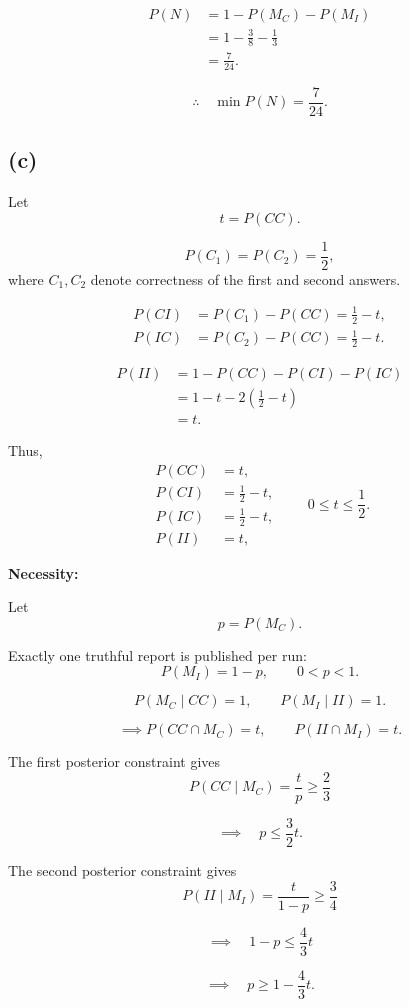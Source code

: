 \documentclass[11pt,a4paper]{article}
\begin{document}
\[
\begin{aligned}
P(N)
&=1-P(M_C)-P(M_I)\\
&=1-\frac38-\frac13\\
&=\frac7{24}.
\end{aligned}
\]

\[
\therefore\quad
\min P(N)=\frac7{24}.
\]


\subsection*{(c)}

Let
\[
t=P(CC).
\]

\[
P(C_1)=P(C_2)=\frac12,
\]
where $C_1,C_2$ denote correctness of the first
and second answers.

\[
\begin{aligned}
P(CI)&=P(C_1)-P(CC)=\frac12-t,\\
P(IC)&=P(C_2)-P(CC)=\frac12-t.
\end{aligned}
\]

\[
\begin{aligned}
P(II)
&=1-P(CC)-P(CI)-P(IC)\\
&=1-t-2\left(\frac12-t\right)\\
&=t.
\end{aligned}
\]

Thus,
\[
\begin{aligned}
P(CC)&=t,\\
P(CI)&=\frac12-t,\\
P(IC)&=\frac12-t,\\
P(II)&=t,
\end{aligned}
\qquad
0\leq t\leq\frac12.
\]

\textbf{Necessity:}

Let
\[
p=P(M_C).
\]

Exactly one truthful report is published per run:
\[
P(M_I)=1-p,
\qquad 0<p<1.
\]

\[
P(M_C\mid CC)=1,
\qquad
P(M_I\mid II)=1.
\]

\[
\implies
P(CC\cap M_C)=t,
\qquad
P(II\cap M_I)=t.
\]

The first posterior constraint gives
\[
P(CC\mid M_C)=\frac{t}{p}\geq\frac23
\]

\[
\implies\quad
p\leq\frac32t.
\]

The second posterior constraint gives
\[
P(II\mid M_I)=\frac{t}{1-p}\geq\frac34
\]

\[
\implies\quad
1-p\leq\frac43t
\]

\[
\implies\quad
p\geq1-\frac43t.
\]
\end{document}
